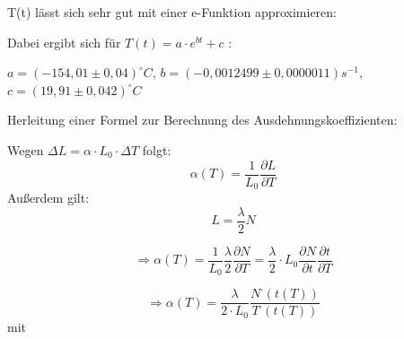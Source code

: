 T(t) lässt sich sehr gut mit einer e-Funktion approximieren:

Dabei ergibt sich für $ T(t) = a \cdot e^{bt} + c $ :

$a = (-154,01 \pm 0,04)^{\circ}C$,
$b=(-0,0012499 \pm 0,0000011)s^{-1}$,
$c=(19,91 \pm 0,042)^{\circ}C$

Herleitung einer Formel zur Berechnung des Ausdehnungskoeffizienten:

Wegen $ \Delta L = \alpha \cdot L_{0} \cdot \Delta T $ folgt: 
\\
\begin{equation}
\alpha (T) = \frac{1}{L_{0}} \frac{\partial L}{\partial T}
\end{equation}
Außerdem gilt: 
\begin{equation}
L = \frac{\lambda}{2} N
\end{equation}

\begin{equation}
\Rightarrow \alpha(T) = \frac{1}{L_{0}} \frac{\lambda}{2} \frac{\partial N}{\partial T} = \frac{\lambda}{2} \cdot L_{0} \frac{\partial N}{\partial t} \frac{\partial t}{\partial T}
\end{equation}

\begin{equation}
\Rightarrow \alpha (T) = \frac{\lambda}{2 \cdot L_{0}} \frac{N^{\cdot}(t(T))}{T^{\cdot}(t(T))}
\end{equation} 
mit 

